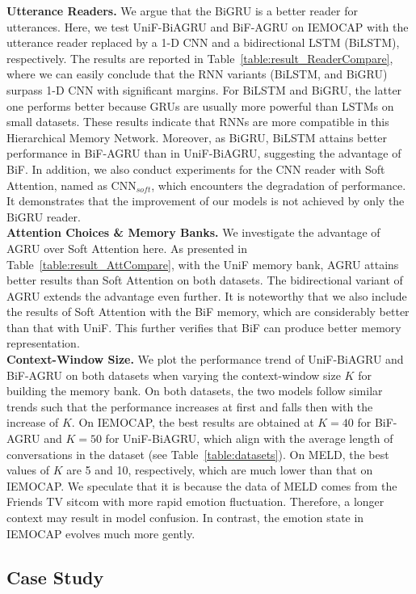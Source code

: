 \documentclass[letterpaper]{article} %
\begin{document}
\noindent\textbf{Utterance Readers.}
We argue that the BiGRU is a better reader for utterances. Here, we test UniF-BiAGRU and BiF-AGRU on IEMOCAP with the utterance reader replaced by a 1-D CNN and a bidirectional LSTM (BiLSTM), respectively. The results are reported in Table~\ref{table:result_ReaderCompare}, where we can easily conclude that the RNN variants (BiLSTM, and BiGRU) surpass 1-D CNN with significant margins. For BiLSTM and BiGRU, the latter one performs better because GRUs are usually more powerful than LSTMs on small datasets. These results indicate that RNNs are more compatible in this Hierarchical Memory Network. Moreover, as BiGRU, BiLSTM attains better performance in BiF-AGRU than in UniF-BiAGRU, suggesting the advantage of BiF. In addition, we also conduct experiments for the CNN reader with Soft Attention, named as CNN$_{soft}$, which encounters the degradation of performance. It demonstrates that the improvement of our models is not achieved by only the BiGRU reader.
\\[1ex]
\noindent\textbf{Attention Choices \& Memory Banks.}
We investigate the advantage of AGRU over Soft Attention here. As presented in Table~\ref{table:result_AttCompare}, with the UniF memory bank, AGRU attains better results than Soft Attention on both datasets. The bidirectional variant of AGRU extends the advantage even further. It is noteworthy that we also include the results of Soft Attention with the BiF memory, which are considerably better than that with UniF. This further verifies that BiF can produce better memory representation.
\\[1ex]
\noindent\textbf{Context-Window Size.}
We plot the performance trend of UniF-BiAGRU and BiF-AGRU on both datasets when varying the context-window size $K$ for building the memory bank. On both datasets, the two models follow similar trends such that the performance increases at first and falls then with the increase of $K$. On IEMOCAP, the best results are obtained at $K=40$ for BiF-AGRU and $K=50$ for UniF-BiAGRU, which align with the average length of conversations in the dataset (see Table~\ref{table:datasets}). On MELD, the best values of $K$ are 5 and 10, respectively, which are much lower than that on IEMOCAP. We speculate that it is because the data of MELD comes from the Friends TV sitcom with more rapid emotion fluctuation. Therefore, a longer context may result in model confusion. In contrast, the emotion state in IEMOCAP evolves much more gently.


\subsection{Case Study}
\label{ssec:case_study}
\end{document}
